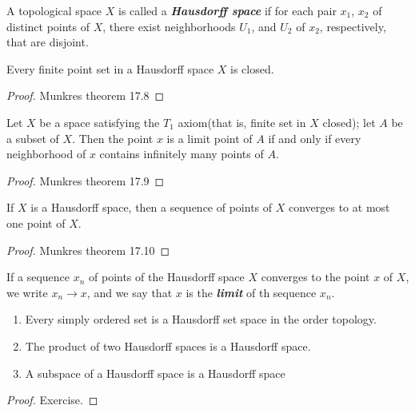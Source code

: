 \begin{mydefinition}
A topological space $X$ is called a \textbf{\emph{Hausdorff space}} if for each pair $x_1$, $x_2$ of distinct points of $X$, there exist neighborhoods $U_1$, and $U_2$ of $x_2$, respectively, that are disjoint.
\end{mydefinition}

\begin{mytheorem}
Every finite point set in a Hausdorff space $X$ is closed.
\end{mytheorem}
\begin{proof}
Munkres theorem 17.8
\end{proof}

\begin{mytheorem}
Let $X$ be a space satisfying the $T_1$ axiom(that is, finite set in $X$ closed); let $A$ be a subset of $X$. Then the point $x$ is a limit point of $A$ if and only if every neighborhood of $x$ contains infinitely many points of $A$.
\end{mytheorem}
\begin{proof}
Munkres theorem 17.9
\end{proof}

\begin{mytheorem}
If $X$ is a Hausdorff space, then a sequence of points of $X$ converges to at most one point of $X$.
\end{mytheorem}
\begin{proof}
Munkres theorem 17.10
\end{proof}

\begin{mydefinition}
If a sequence $x_n$ of points of the Hausdorff space $X$ converges to the point $x$ of $X$, we write $x_n\to x$, and we say that $x$ is the \textbf{\emph{limit}} of th sequence $x_n$.
\end{mydefinition}

\begin{mytheorem}
\begin{enumerate}[label={(\alph*)}]
\item Every simply ordered set is a Hausdorff set space in the order topology.
\item The product of two Hausdorff spaces is a Hausdorff space.
\item A subspace of a Hausdorff space is a Hausdorff space
\end{enumerate}  
\end{mytheorem}
\begin{proof}
Exercise.
\end{proof}

